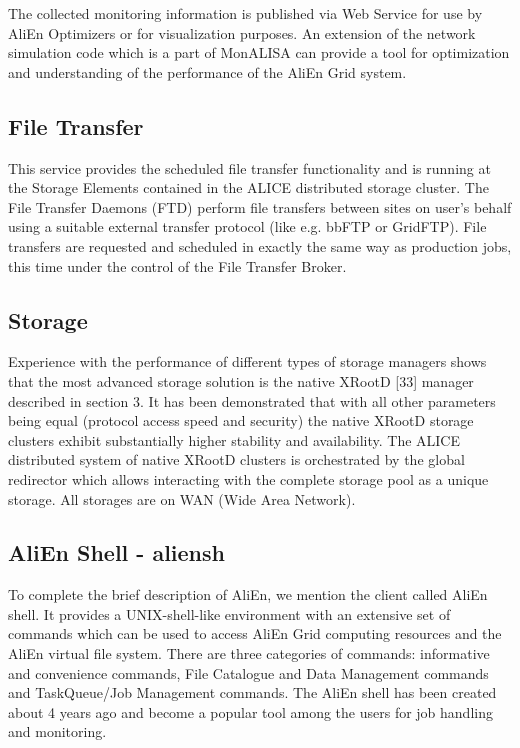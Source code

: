 \documentclass{intech}
\begin{document}
The collected monitoring information is published via Web Service
for use by AliEn Optimizers or for visualization purposes. An
extension of the network simulation code which is a part of MonALISA
can provide a tool for optimization and understanding of the
performance of the AliEn Grid system.

\subsection{File Transfer}
%
This service provides the scheduled file transfer
functionality and is running at the Storage Elements contained in
the ALICE distributed storage cluster. The File Transfer Daemons
(FTD) perform file transfers between sites on user's behalf using a
suitable external transfer protocol (like e.g. bbFTP or GridFTP).
File transfers are requested and scheduled in exactly the same way
as production jobs, this time under the control of the File Transfer
Broker.

\subsection{Storage}
%
Experience with the performance of different types of storage
managers shows that the most advanced storage solution is the native
XRootD [33] manager described in section 3. It has been demonstrated
that with all other parameters being equal (protocol access speed
and security) the native XRootD storage clusters exhibit
substantially higher stability and availability. The ALICE
distributed system of native XRootD clusters is orchestrated by the
global redirector which allows interacting with the complete storage
pool as a unique storage.  All storages are on WAN (Wide Area
Network).

\subsection{AliEn Shell - aliensh}
%
To complete the brief description of AliEn, we mention the client
called AliEn shell. It provides a UNIX-shell-like environment with
an extensive set of commands which can be used to access AliEn Grid
computing resources and the AliEn virtual file system.  There are
three categories of commands: informative and convenience commands,
File Catalogue and Data Management commands and TaskQueue/Job
Management commands. The AliEn shell has been created about 4 years
ago and become a popular tool among the users for job handling and
monitoring.
\end{document}

